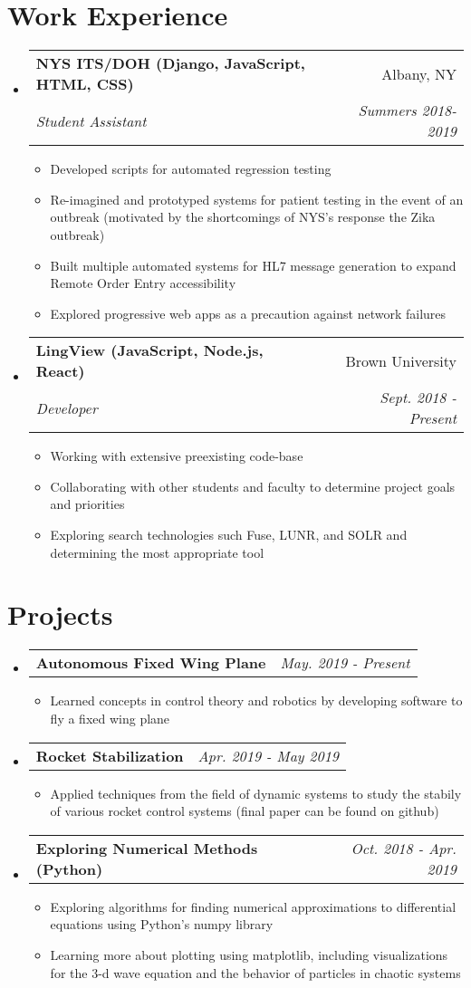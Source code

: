 \documentclass[letterpaper,11pt]{article}
\makeatletter
\newcommand{\resumeItem}[2]{
  \item\small{
    \textbf{#1}{#2 \vspace{-2pt}}
  }
}
\newcommand{\resumeSubheading}[4]{
  \vspace{-1pt}\item
    \begin{tabular*}{0.97\textwidth}{l@{\extracolsep{\fill}}r}
      \textbf{#1} & #2 \\
      \textit{\small#3} & \textit{\small #4} \\
    \end{tabular*}\vspace{-5pt}
}
\newcommand{\resumeSubheadingSimple}[2]{
  \vspace{-1pt}\item
    \begin{tabular*}{0.97\textwidth}{l@{\extracolsep{\fill}}r}
      \textbf{#1} & \textit{\small#2}\\
    \end{tabular*}\vspace{-5pt}
}
\newcommand{\resumeSubHeadingListStart}{\begin{itemize}[leftmargin=*]}
\newcommand{\resumeSubHeadingListEnd}{\end{itemize}}
\newcommand{\resumeItemListStart}{\begin{itemize}}
\newcommand{\resumeItemListEnd}{\end{itemize}\vspace{-5pt}}
\makeatother
\begin{document}
\section{Work Experience}
  \resumeSubHeadingListStart
    \resumeSubheading{NYS ITS/DOH (Django, JavaScript, HTML, CSS)}
    {Albany, NY}{Student Assistant}{Summers 2018-2019}
      \resumeItemListStart
        \resumeItem{}
        {Developed scripts for automated regression testing}
        \resumeItem{}
        {Re-imagined and prototyped systems for patient testing in the event of an outbreak (motivated by the shortcomings of NYS's response the Zika outbreak)}
        \resumeItem{}
        {Built multiple automated systems for HL7 message generation to expand Remote Order Entry accessibility}
        \resumeItem{}
        {Explored progressive web apps as a precaution against network failures}
      \resumeItemListEnd
    \resumeSubheading{LingView (JavaScript, Node.js, React)}{Brown University}{Developer}{Sept. 2018 - Present}
      \resumeItemListStart
        \resumeItem{}
        {Working with extensive preexisting code-base}
        \resumeItem{}
        {Collaborating with other students and faculty to determine project goals and priorities}
        \resumeItem{}
        {Exploring search technologies such Fuse, LUNR, and SOLR and determining the most appropriate tool}
      \resumeItemListEnd
  \resumeSubHeadingListEnd

\section{Projects}
    \resumeSubHeadingListStart
        \resumeSubheadingSimple
          {Autonomous Fixed Wing Plane}{May. 2019 - Present}
          \resumeItemListStart
            \resumeItem{}
            {Learned concepts in control theory and robotics by developing software to fly a fixed wing plane}
          \resumeItemListEnd
        \resumeSubheadingSimple
          {Rocket Stabilization}{Apr. 2019 - May 2019}
          \resumeItemListStart
            \resumeItem{}
            {Applied techniques from the field of dynamic systems to study the stabily of various rocket control systems (final paper can be found on github)}
          \resumeItemListEnd
        \resumeSubheadingSimple
          {Exploring Numerical Methods (Python)}{Oct. 2018 - Apr. 2019}
          \resumeItemListStart
            \resumeItem{}
              {Exploring algorithms for finding numerical approximations to differential equations using Python's numpy library}
            \resumeItem{}
              {Learning more about plotting using matplotlib, including visualizations for the 3-d wave equation and the behavior of particles in chaotic systems}
          \resumeItemListEnd
    \resumeSubHeadingListEnd
\end{document}

